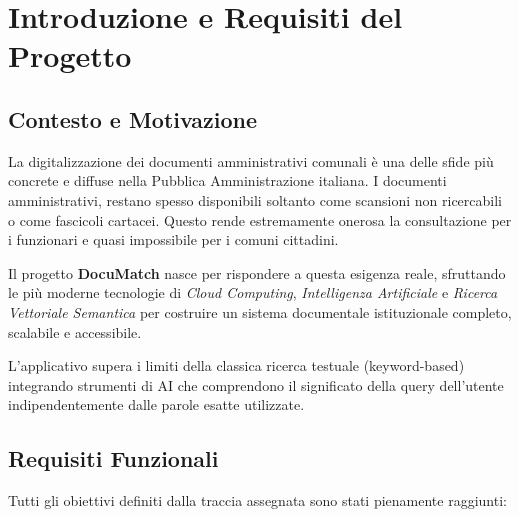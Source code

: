 \documentclass[12pt,a4paper,oneside]{report}
\begin{document}
\tableofcontents
\newpage

\chapter{Introduzione e Requisiti del Progetto}

\section{Contesto e Motivazione}

La digitalizzazione dei documenti amministrativi comunali \`{e} una delle sfide pi\`{u}
concrete e diffuse nella Pubblica Amministrazione italiana. I documenti amministrativi, restano spesso disponibili soltanto come
scansioni non ricercabili o come fascicoli cartacei. Questo rende estremamente onerosa
la consultazione per i funzionari e quasi impossibile per i comuni cittadini.

Il progetto \textbf{DocuMatch} nasce per rispondere a questa esigenza reale, sfruttando
le pi\`{u} moderne tecnologie di \textit{Cloud Computing}, \textit{Intelligenza Artificiale}
e \textit{Ricerca Vettoriale Semantica} per costruire un sistema documentale istituzionale
completo, scalabile e accessibile.

L'applicativo supera i limiti della classica ricerca testuale (keyword-based) integrando
strumenti di AI che comprendono il significato della query dell'utente indipendentemente
dalle parole esatte utilizzate.

\section{Requisiti Funzionali}

Tutti gli obiettivi definiti dalla traccia assegnata sono stati pienamente raggiunti:
\end{document}
